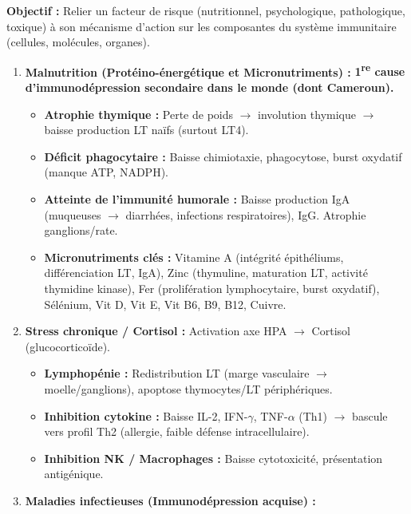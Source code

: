 \documentclass[11pt]{article}
\begin{document}
\begin{methode}
    \textbf{Objectif :} Relier un facteur de risque (nutritionnel, psychologique, pathologique, toxique) à son mécanisme d'action sur les composantes du système immunitaire (cellules, molécules, organes).
    \begin{enumerate}
        \item \textbf{Malnutrition (Protéino-énergétique et Micronutriments) :} \textbf{1\textsuperscript{re} cause d'immunodépression secondaire dans le monde (dont Cameroun).}
        \begin{itemize}
            \item \textbf{Atrophie thymique :} Perte de poids $\rightarrow$ involution thymique $\rightarrow$ baisse production LT naïfs (surtout LT4).
            \item \textbf{Déficit phagocytaire :} Baisse chimiotaxie, phagocytose, burst oxydatif (manque ATP, NADPH).
            \item \textbf{Atteinte de l'immunité humorale :} Baisse production IgA (muqueuses $\rightarrow$ diarrhées, infections respiratoires), IgG. Atrophie ganglions/rate.
            \item \textbf{Micronutriments clés :} Vitamine A (intégrité épithéliums, différenciation LT, IgA), Zinc (thymuline, maturation LT, activité thymidine kinase), Fer (prolifération lymphocytaire, burst oxydatif), Sélénium, Vit D, Vit E, Vit B6, B9, B12, Cuivre.
        \end{itemize}
        \item \textbf{Stress chronique / Cortisol :} Activation axe HPA $\rightarrow$ Cortisol (glucocorticoïde).
        \begin{itemize}
            \item \textbf{Lymphopénie :} Redistribution LT (marge vasculaire $\rightarrow$ moelle/ganglions), apoptose thymocytes/LT périphériques.
            \item \textbf{Inhibition cytokine :} Baisse IL-2, IFN-$\gamma$, TNF-$\alpha$ (Th1) $\rightarrow$ bascule vers profil Th2 (allergie, faible défense intracellulaire).
            \item \textbf{Inhibition NK / Macrophages :} Baisse cytotoxicité, présentation antigénique.
        \end{itemize}
        \item \textbf{Maladies infectieuses (Immunodépression acquise) :}
        \begin{itemize}

\end{itemize}
\end{enumerate}
\end{methode}
\end{document}
